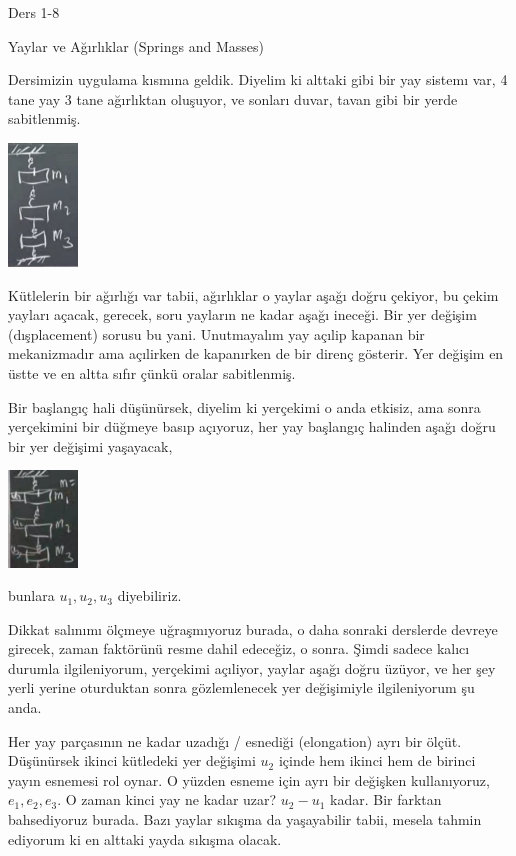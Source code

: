 \documentclass[12pt,fleqn]{article}\usepackage{../../common}
\begin{document}
Ders 1-8

Yaylar ve Ağırlıklar (Springs and Masses)

Dersimizin uygulama kısmına geldik. Diyelim ki alttaki gibi bir yay sistemı var,
4 tane yay 3 tane ağırlıktan oluşuyor, ve sonları duvar, tavan gibi bir yerde
sabitlenmiş.

\includegraphics[width=5em]{compscieng_1_08_01.png}

Kütlelerin bir ağırlığı var tabii, ağırlıklar o yaylar aşağı doğru çekiyor, bu
çekim yayları açacak, gerecek, soru yayların ne kadar aşağı ineceği.  Bir yer
değişim (dışplacement) sorusu bu yani. Unutmayalım yay açılip kapanan bir
mekanizmadır ama açılirken de kapanırken de bir direnç gösterir. Yer değişim en
üstte ve en altta sıfır çünkü oralar sabitlenmiş.

Bir başlangıç hali düşünürsek, diyelim ki yerçekimi o anda etkisiz, ama sonra
yerçekimini bir düğmeye basıp açıyoruz, her yay başlangıç halinden aşağı
doğru bir yer değişimi yaşayacak, 

\includegraphics[width=5em]{compscieng_1_08_02.png}

bunlara $u_1,u_2,u_3$ diyebiliriz.

Dikkat salınımı ölçmeye uğraşmıyoruz burada, o daha sonraki derslerde devreye
girecek, zaman faktörünü resme dahil edeceğiz, o sonra. Şimdi sadece kalıcı
durumla ilgileniyorum, yerçekimi açıliyor, yaylar aşağı doğru üzüyor, ve her şey
yerli yerine oturduktan sonra gözlemlenecek yer değişimiyle ilgileniyorum şu
anda.

Her yay parçasının ne kadar uzadığı / esnediği (elongation) ayrı bir ölçüt.
Düşünürsek ikinci kütledeki yer değişimi $u_2$ içinde hem ikinci hem de birinci
yayın esnemesi rol oynar. O yüzden esneme için ayrı bir değişken kullanıyoruz,
$e_1,e_2,e_3$. O zaman kinci yay ne kadar uzar? $u_2-u_1$ kadar. Bir farktan
bahsediyoruz burada. Bazı yaylar sıkışma da yaşayabilir tabii, mesela tahmin
ediyorum ki en alttaki yayda sıkışma olacak.
\end{document}
